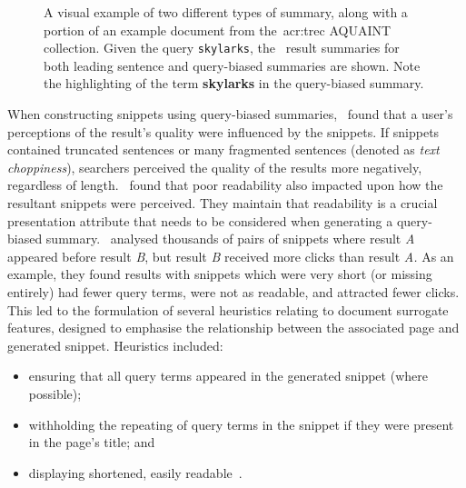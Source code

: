 \begin{figure}[t!]
    \centering
    \caption[Leading sentence and query-biased summary examples]{A visual example of two different types of summary, along with a portion of an example document from the~\gls{acr:trec} AQUAINT collection. Given the query \texttt{skylarks}, the \searchlogo~result summaries for both leading sentence and query-biased summaries are shown. Note the highlighting of the term \textbf{skylarks} in the query-biased summary.}
    \label{fig:snippet_types}
\end{figure}

When constructing snippets using query-biased summaries,~\cite{rose2007snippet_attributes} found that a user's perceptions of the result's quality were influenced by the snippets. If snippets contained truncated sentences or many fragmented sentences (denoted as \emph{text choppiness}), searchers perceived the quality of the results more negatively, regardless of length.~\cite{kanungo2009snippet_readability} found that poor readability also impacted upon how the resultant snippets were perceived. They maintain that readability is a crucial presentation attribute that needs to be considered when generating a query-biased summary.~\cite{clarke2007caption_features} analysed thousands of pairs of snippets where result \emph{A} appeared before result \emph{B}, but result \emph{B} received more clicks than result \emph{A.} As an example, they found results with snippets which were very short (or missing entirely) had fewer query terms, were not as readable, and attracted fewer clicks. This led to the formulation of several heuristics relating to document surrogate features, designed to emphasise the relationship between the associated page and generated snippet. Heuristics included:

\begin{itemize}
    \item{ensuring that all query terms appeared in the generated snippet (where possible);}
    \item{withholding the repeating of query terms in the snippet if they were present in the page's title; and}
    \item{displaying shortened, easily readable~.}
\end{itemize}

